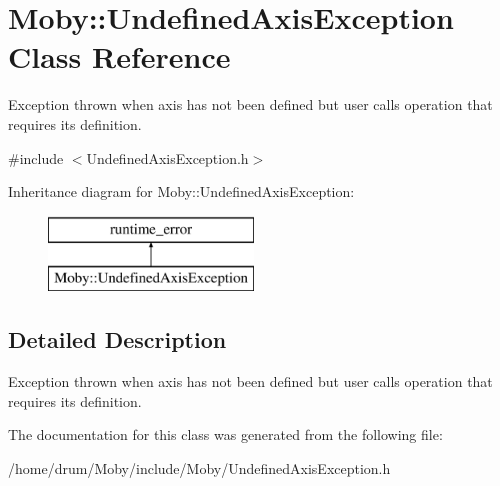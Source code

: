 \section{Moby\-:\-:Undefined\-Axis\-Exception Class Reference}
\label{classMoby_1_1UndefinedAxisException}


Exception thrown when axis has not been defined but user calls operation that requires its definition.  




{\ttfamily \#include $<$Undefined\-Axis\-Exception.\-h$>$}

Inheritance diagram for Moby\-:\-:Undefined\-Axis\-Exception\-:\begin{figure}[H]
\begin{center}
\leavevmode
\includegraphics[height=2.000000cm]{classMoby_1_1UndefinedAxisException}
\end{center}
\end{figure}


\subsection{Detailed Description}
Exception thrown when axis has not been defined but user calls operation that requires its definition. 

The documentation for this class was generated from the following file\-:\begin{DoxyCompactItemize}
\item 
/home/drum/\-Moby/include/\-Moby/Undefined\-Axis\-Exception.\-h\end{DoxyCompactItemize}
